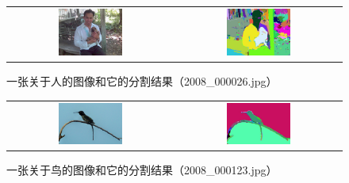 \documentclass[a4paper, 12pt, UTF8]{article}
\begin{document}
\begin{figure}[h!]
    \centering
    \begin{tabular}{cc}
        \includegraphics[width=0.4\textwidth]{src/images/2008_000026.jpg} &
        \includegraphics[width=0.4\textwidth]{src/images/2008_000026_output.jpg}
    \end{tabular}
    \caption{一张关于人的图像和它的分割结果（2008\_000026.jpg）}
    \label{figure_person}
\end{figure}

\begin{figure}[h!]
    \centering
    \begin{tabular}{cc}
        \includegraphics[width=0.4\textwidth]{src/images/2008_000123.jpg} &
        \includegraphics[width=0.4\textwidth]{src/images/2008_000123_output.jpg}
    \end{tabular}
    \caption{一张关于鸟的图像和它的分割结果（2008\_000123.jpg）}
    \label{figure_bird}
\end{figure}
\end{document}
